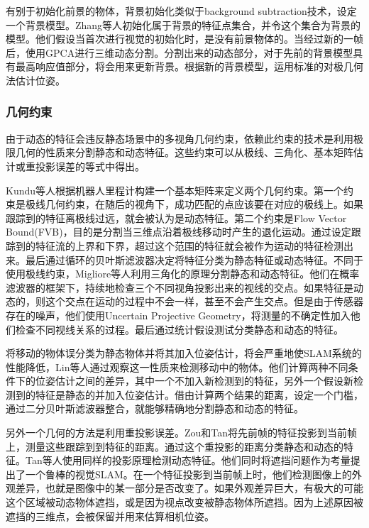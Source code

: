 有别于初始化前景的物体，背景初始化类似于background subtraction技术，设定一个背景模型\cite{Babaee2017A,Piccardi2005Background}。Zhang等人\cite{Zhang2012Visual}初始化属于背景的特征点集合，并令这个集合为背景的模型。他们假设当首次进行视觉的初始化时，是没有前景物体的。当经过新的一帧后，使用GPCA\cite{Ren2005Generalized}进行三维动态分割。分割出来的动态部分，对于先前的背景模型具有最高响应值部分，将会用来更新背景。根据新的背景模型，运用标准的对极几何法估计位姿。

\subsubsection{几何约束}
由于动态的特征会违反静态场景中的多视角几何约束，依赖此约束的技术是利用极限几何的性质\cite{Hartley2008Multiple}来分割静态和动态特征。这些约束可以从极线、三角化、基本矩阵估计或重投影误差的等式中得出。

Kundu等人\cite{Kundu2009Moving}根据机器人里程计构建一个基本矩阵来定义两个几何约束。第一个约束是极线几何约束，在随后的视角下，成功匹配的点应该要在对应的极线上。如果跟踪到的特征离极线过远，就会被认为是动态特征。第二个约束是Flow Vector Bound(FVB)，目的是分割当三维点沿着极线移动时产生的退化运动。通过设定跟踪到的特征流的上界和下界，超过这个范围的特征就会被作为运动的特征检测出来。最后通过循环的贝叶斯滤波器决定将特征分类为静态特征或动态特征。不同于使用极线约束，Migliore等人\cite{Migliore2009Use}利用三角化的原理分割静态和动态特征。他们在概率滤波器的框架下，持续地检查三个不同视角投影出来的视线的交点。如果特征是动态的，则这个交点在运动的过程中不会一样，甚至不会产生交点。但是由于传感器存在的噪声，他们使用Uncertain Projective Geometry\cite{Heuel2001Matching}，将测量的不确定性加入他们检查不同视线关系的过程。最后通过统计假设测试分类静态和动态的特征。

将移动的物体误分类为静态物体并将其加入位姿估计，将会严重地使SLAM系统的性能降低，Lin等人\cite{Wang2007Simultaneous}通过观察这一性质来检测移动中的物体。他们计算两种不同条件下的位姿估计之间的差异，其中一个不加入新检测到的特征，另外一个假设新检测到的特征是静态的并加入位姿估计。借由计算两个结果的距离，设定一个门槛，通过二分贝叶斯滤波器整合，就能够精确地分割静态和动态的特征。

另外一个几何的方法是利用重投影误差。Zou和Tan\cite{Danping2013CoSLAM}将先前帧的特征投影到当前帧上，测量这些跟踪到到特征的距离。通过这个重投影的距离分类静态和动态的特征。Tan等人\cite{Wei2013Robust}使用同样的投影原理检测动态特征。他们同时将遮挡问题作为考量提出了一个鲁棒的视觉SLAM。在一个特征投影到当前帧上时，他们检测图像上的外观差异，也就是图像中的某一部分是否改变了。如果外观差异巨大，有极大的可能这个区域被动态物体遮挡，或是因为视点改变被静态物体所遮挡。因为上述原因被遮挡的三维点，会被保留并用来估算相机位姿。

